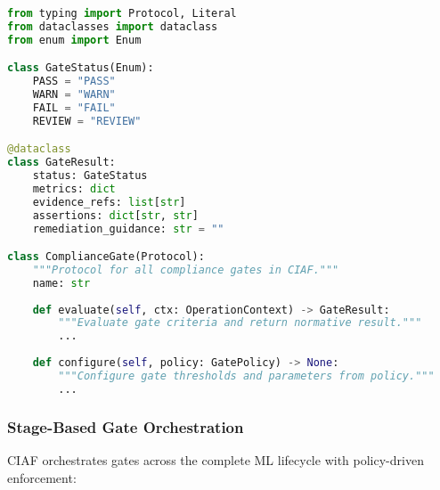 \documentclass[12pt,a4paper]{article}
\begin{document}
\begin{lstlisting}[language=Python, caption=Compliance Gate Protocol Interface]
from typing import Protocol, Literal
from dataclasses import dataclass
from enum import Enum

class GateStatus(Enum):
    PASS = "PASS"
    WARN = "WARN" 
    FAIL = "FAIL"
    REVIEW = "REVIEW"

@dataclass
class GateResult:
    status: GateStatus
    metrics: dict
    evidence_refs: list[str]
    assertions: dict[str, str]
    remediation_guidance: str = ""

class ComplianceGate(Protocol):
    """Protocol for all compliance gates in CIAF."""
    name: str
    
    def evaluate(self, ctx: OperationContext) -> GateResult:
        """Evaluate gate criteria and return normative result."""
        ...
    
    def configure(self, policy: GatePolicy) -> None:
        """Configure gate thresholds and parameters from policy."""
        ...
\end{lstlisting}

\subsubsection{Stage-Based Gate Orchestration}

CIAF orchestrates gates across the complete ML lifecycle with policy-driven enforcement:
\end{document}

